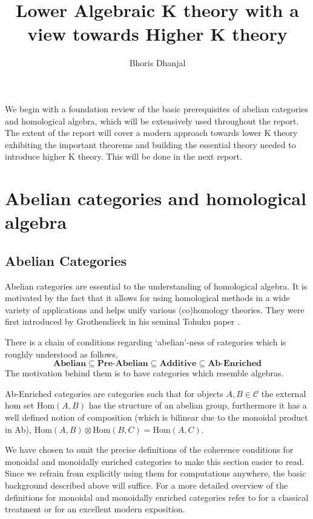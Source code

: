 \documentclass[12pt]{article}
\title{Lower Algebraic K theory with a view towards Higher K theory}
\author{Bhoris Dhanjal}
\numberwithin{equation}{section}
\newcommand{\Hom}{{\mathrm{Hom}}}
\begin{document}
	\tableofcontents
	\maketitle
	
	We begin with a foundation review of the basic prerequisites of abelian categories and homological algebra, which will be extensively used throughout the report. The extent of the report will cover a modern approach towards lower K theory exhibiting the important theorems and building the essential theory needed to introduce higher K theory. This will be done in the next report.
	\section{Abelian categories and homological algebra}
	\subsection{Abelian Categories}
	Abelian categories are essential to the understanding of homological algebra. It is motivated by the fact that it allows for using homological methods in a wide variety of applications and helps unify various (co)homology theories. They were first introduced by Grothendieck in his seminal Tohuku paper \cite{grothendieck1957quelques}.
	
	There is a chain of conditions regarding `abelian'-ness of categories which is roughly understood as follows,
	\[ \textbf{Abelian} \subseteq \textbf{Pre-Abelian} \subseteq \textbf{Additive} \subseteq \textbf{Ab-Enriched}\]
	The motivation behind them is to have categories which resemble algebras.
	
	Ab-Enriched categories are categories such that for objects $A,B \in \mathcal{C}$ the external hom set $\Hom(A,B)$ has the structure of an abelian group, furthermore it has a well defined notion of composition (which is bilinear due to the monoidal product in Ab), $\Hom(A,B)\otimes \Hom(B,C) =\Hom(A,C)$. 
	
	We have chosen to omit the precise definitions of the coherence conditions for monoidal and monoidally enriched categories to make this section easier to read. Since we refrain from explicitly using them for computations anywhere, the basic background described above will suffice. For a more detailed overview of the definitions for monoidal and monoidally enriched categories refer to \cite{lane1998categories} for a classical treatment or \cite{riehl2017category} for an excellent modern exposition. 
	
\end{document}
